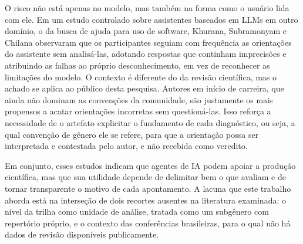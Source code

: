 O risco não está apenas no modelo, mas também na forma como o usuário lida com ele. Em um estudo controlado sobre assistentes baseados em LLMs em outro domínio, o da busca de ajuda para uso de software, Khurana, Subramonyam e Chilana  observaram que os participantes seguiam com frequência as orientações do assistente sem analisá-las, adotando respostas que continham imprecisões e atribuindo as falhas ao próprio desconhecimento, em vez de reconhecer as limitações do modelo. O contexto é diferente do da revisão científica, mas o achado se aplica ao público desta pesquisa. Autores em início de carreira, que ainda não dominam as convenções da comunidade, são justamente os mais propensos a acatar orientações incorretas sem questioná-las. Isso reforça a necessidade de o artefato explicitar o fundamento de cada diagnóstico, ou seja, a qual convenção de gênero ele se refere, para que a orientação possa ser interpretada e contestada pelo autor, e não recebida como veredito.

Em conjunto, esses estudos indicam que agentes de IA podem apoiar a produção científica, mas que sua utilidade depende de delimitar bem o que avaliam e de tornar transparente o motivo de cada apontamento. A lacuna que este trabalho aborda está na interseção de dois recortes ausentes na literatura examinada: o nível da trilha como unidade de análise, tratada como um subgênero com repertório próprio, e o contexto das conferências brasileiras, para o qual não há dados de revisão disponíveis publicamente.